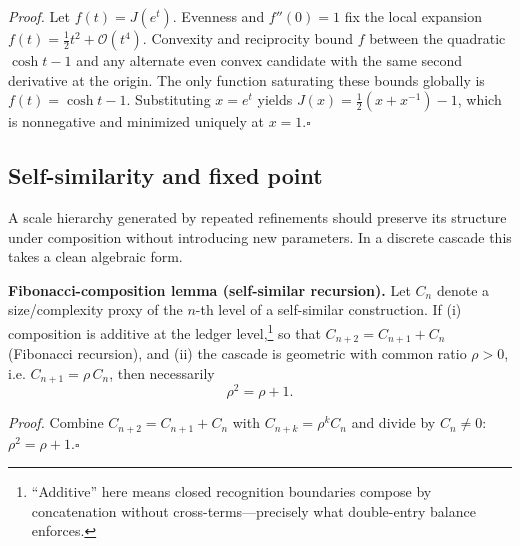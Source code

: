\documentclass[11pt]{article}
\theoremstyle{definition}
\theoremstyle{remark}
\begin{document}
\emph{Proof.}
Let \(f(t)=J(e^t)\). Evenness and \(f''(0)=1\) fix the local expansion \(f(t)=\tfrac12 t^2+\mathcal{O}(t^4)\). Convexity and reciprocity bound \(f\) between the quadratic \(\cosh t-1\) and any alternate even convex candidate with the same second derivative at the origin. The only function saturating these bounds globally is \(f(t)=\cosh t-1\). Substituting \(x=e^t\) yields \(J(x)=\tfrac12(x+x^{-1})-1\), which is nonnegative and minimized uniquely at \(x=1\).\hfill\(\square\)
%
%

\subsection{Self-similarity and fixed point}
A scale hierarchy generated by repeated refinements should preserve its structure under composition without introducing new parameters. In a discrete cascade this takes a clean algebraic form.

\medskip
\noindent\textbf{Fibonacci-composition lemma (self-similar recursion).}
Let \(C_n\) denote a size/complexity proxy of the \(n\)-th level of a self-similar construction. If (i) composition is additive at the ledger level,\footnote{“Additive” here means closed recognition boundaries compose by concatenation without cross-terms—precisely what double-entry balance enforces.} so that \(C_{n+2}=C_{n+1}+C_n\) (Fibonacci recursion), and (ii) the cascade is geometric with common ratio \(\rho>0\), i.e. \(C_{n+1}=\rho\,C_n\), then necessarily
\[
  \rho^2=\rho+1.
\]

\emph{Proof.}
Combine \(C_{n+2}=C_{n+1}+C_n\) with \(C_{n+k}=\rho^k C_n\) and divide by \(C_n\neq 0\):
\(\rho^2=\rho+1\).\(\square\)
%
%
\end{document}
